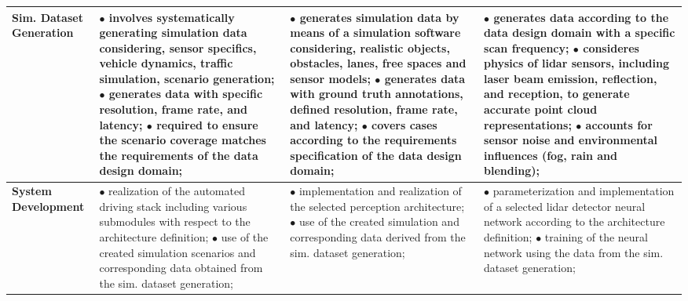 \begin{table*}[p!]
\begin{tabularx}{\linewidth}{p{3.6cm} *{3}{>{\raggedright\arraybackslash}X}}
		\midrule
		\textbf{Sim. Dataset Generation} 
		& $\bullet$ involves systematically generating simulation data considering, sensor specifics, vehicle dynamics, traffic simulation, scenario generation; $\bullet$ generates data with specific resolution, frame rate, and latency; $\bullet$ required to ensure the scenario coverage matches the requirements of the data design domain;
		& $\bullet$ generates simulation data by means of a simulation software considering, realistic objects, obstacles, lanes, free spaces and sensor models; $\bullet$ generates data with ground truth annotations, defined resolution, frame rate, and latency; $\bullet$ covers cases according to the requirements specification of the data design domain;
		& $\bullet$ generates data according to the data design domain with a specific scan frequency; $\bullet$ consideres physics of lidar sensors, including laser beam emission, reflection, and reception, to generate accurate point cloud representations; $\bullet$ accounts for sensor noise and environmental influences (fog, rain and blending);
		\\
		\midrule
		\textbf{System Development} 
		& $\bullet$ realization of the automated driving stack including various submodules with respect to the architecture definition; $\bullet$ use of the created simulation scenarios and corresponding data obtained from the sim. dataset generation;
		& $\bullet$ implementation and realization of the selected perception architecture; $\bullet$ use of the created simulation and corresponding data derived from the sim. dataset generation;
		& $\bullet$ parameterization and implementation of a selected lidar detector neural network according to the architecture definition; $\bullet$ training of the neural network using the data from the sim. dataset generation; \\
		\bottomrule	
	\end{tabularx}
	\label{tab:exampl_design}
\end{table*}


